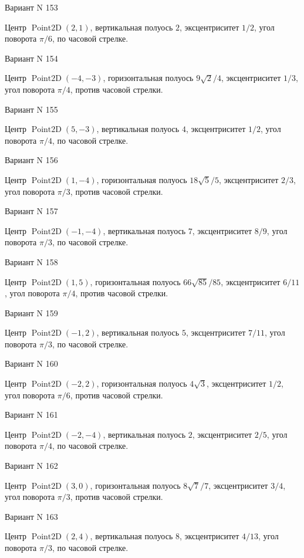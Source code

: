 \documentclass[11pt]{report}
\begin{document}
Вариант N 153

Центр $\operatorname{Point2D}\left(2, 1\right)$, вертикальная полуось $2$, эксцентриситет $1 / 2$, угол поворота $\pi / 6$, по часовой стрелке.

Вариант N 154

Центр $\operatorname{Point2D}\left(-4, -3\right)$, горизонтальная полуось $9 \sqrt{2} / 4$, эксцентриситет $1 / 3$, угол поворота $\pi / 4$, против часовой стрелки.

Вариант N 155

Центр $\operatorname{Point2D}\left(5, -3\right)$, вертикальная полуось $4$, эксцентриситет $1 / 2$, угол поворота $\pi / 4$, по часовой стрелке.

Вариант N 156

Центр $\operatorname{Point2D}\left(1, -4\right)$, горизонтальная полуось $18 \sqrt{5} / 5$, эксцентриситет $2 / 3$, угол поворота $\pi / 3$, против часовой стрелки.

Вариант N 157

Центр $\operatorname{Point2D}\left(-1, -4\right)$, вертикальная полуось $7$, эксцентриситет $8 / 9$, угол поворота $\pi / 3$, по часовой стрелке.

Вариант N 158

Центр $\operatorname{Point2D}\left(1, 5\right)$, горизонтальная полуось $66 \sqrt{85} / 85$, эксцентриситет $6 / 11$, угол поворота $\pi / 4$, против часовой стрелки.

Вариант N 159

Центр $\operatorname{Point2D}\left(-1, 2\right)$, вертикальная полуось $5$, эксцентриситет $7 / 11$, угол поворота $\pi / 3$, по часовой стрелке.

Вариант N 160

Центр $\operatorname{Point2D}\left(-2, 2\right)$, горизонтальная полуось $4 \sqrt{3}$, эксцентриситет $1 / 2$, угол поворота $\pi / 6$, против часовой стрелки.

Вариант N 161

Центр $\operatorname{Point2D}\left(-2, -4\right)$, вертикальная полуось $2$, эксцентриситет $2 / 5$, угол поворота $\pi / 4$, по часовой стрелке.

Вариант N 162

Центр $\operatorname{Point2D}\left(3, 0\right)$, горизонтальная полуось $8 \sqrt{7} / 7$, эксцентриситет $3 / 4$, угол поворота $\pi / 3$, против часовой стрелки.

Вариант N 163

Центр $\operatorname{Point2D}\left(2, 4\right)$, вертикальная полуось $8$, эксцентриситет $4 / 13$, угол поворота $\pi / 3$, по часовой стрелке.
\end{document}
